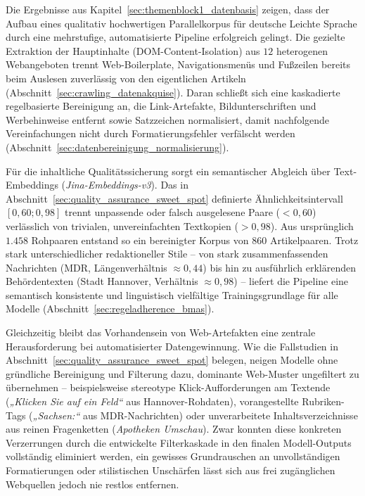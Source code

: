 Die Ergebnisse aus Kapitel~\ref{sec:themenblock1_datenbasis} zeigen, dass der Aufbau eines qualitativ hochwertigen Parallelkorpus für deutsche Leichte Sprache durch eine mehrstufige, automatisierte Pipeline erfolgreich gelingt. Die gezielte Extraktion der Hauptinhalte (DOM-Content-Isolation) aus $12$ heterogenen Webangeboten trennt Web-Boilerplate, Navigationsmenüs und Fußzeilen bereits beim Auslesen zuverlässig von den eigentlichen Artikeln (Abschnitt~\ref{sec:crawling_datenakquise}). Daran schließt sich eine kaskadierte regelbasierte Bereinigung an, die Link-Artefakte, Bildunterschriften und Werbehinweise entfernt sowie Satzzeichen normalisiert, damit nachfolgende Vereinfachungen nicht durch Formatierungsfehler verfälscht werden (Abschnitt~\ref{sec:datenbereinigung_normalisierung}). 

Für die inhaltliche Qualitätssicherung sorgt ein semantischer Abgleich über Text-Embeddings (\textit{Jina-Embeddings-v3}). Das in Abschnitt~\ref{sec:quality_assurance_sweet_spot} definierte Ähnlichkeitsintervall $[0{,}60; 0{,}98]$ trennt unpassende oder falsch ausgelesene Paare ($< 0{,}60$) verlässlich von trivialen, unvereinfachten Textkopien ($> 0{,}98$). Aus ursprünglich $1.458$ Rohpaaren entstand so ein bereinigter Korpus von $860$ Artikelpaaren. Trotz stark unterschiedlicher redaktioneller Stile – von stark zusammenfassenden Nachrichten (MDR, Längenverhältnis $\approx 0{,}44$) bis hin zu ausführlich erklärenden Behördentexten (Stadt Hannover, Verhältnis $\approx 0{,}98$) – liefert die Pipeline eine semantisch konsistente und linguistisch vielfältige Trainingsgrundlage für alle Modelle (Abschnitt~\ref{sec:regeladherence_bmas}).

Gleichzeitig bleibt das Vorhandensein von Web-Artefakten eine zentrale Herausforderung bei automatisierter Datengewinnung. Wie die Fallstudien in Abschnitt~\ref{sec:quality_assurance_sweet_spot} belegen, neigen Modelle ohne gründliche Bereinigung und Filterung dazu, dominante Web-Muster ungefiltert zu übernehmen – beispielsweise stereotype Klick-Aufforderungen am Textende (\textit{„Klicken Sie auf ein Feld“} aus Hannover-Rohdaten), vorangestellte Rubriken-Tags (\textit{„Sachsen:“} aus MDR-Nachrichten) oder unverarbeitete Inhaltsverzeichnisse aus reinen Fragenketten (\textit{Apotheken Umschau}). Zwar konnten diese konkreten Verzerrungen durch die entwickelte Filterkaskade in den finalen Modell-Outputs vollständig eliminiert werden, ein gewisses Grundrauschen an unvollständigen Formatierungen oder stilistischen Unschärfen lässt sich aus frei zugänglichen Webquellen jedoch nie restlos entfernen.

